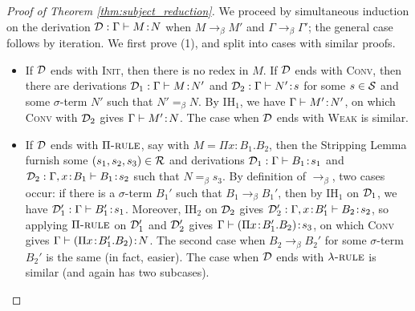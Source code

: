 \documentclass[reqno, twoside]{article}
\begin{document}
    \begin{proof}[Proof of Theorem \ref{thm:subject_reduction}]
        We proceed by simultaneous induction on the derivation $\mathcal{D}:\Gamma\vdash M\!:\!N$ when $M\rightarrow_\beta M'$ and $\Gamma\rightarrow_\beta\Gamma'$; the general case follows by iteration. We first prove (1), and split into cases with similar proofs.
        \begin{itemize}\small\vspace{-0.05in}
            \item If $\mathcal{D}$ ends with \textsc{Init}, then there is no redex in $M$. If $\mathcal{D}$ ends with \textsc{Conv}, then there are derivations $\mathcal{D}_1:\Gamma\vdash M\!:\!N'$ and $\mathcal{D}_2:\Gamma\vdash N'\!:\! s$ for some $s\in\mathcal{S}$ and some $\sigma$-term $N'$ such that $N'=_\beta N$. By $\mathrm{IH}_1$, we have $\Gamma\vdash M'\!:\!N'$, on which \textsc{Conv} with $\mathcal{D}_2$ gives $\Gamma\vdash M'\!:\!N$. The case when $\mathcal{D}$ ends with \textsc{Weak} is similar.
                \vspace{-0.05in}
            \item If $\mathcal{D}$ ends with $\Pi{\normalfont\textsc{-rule}}$, say with $M=\Pi x\!:\!B_1.B_2$, then the Stripping Lemma furnish some $(s_1,s_2,s_3)\in\mathcal{R}$ and derivations $\mathcal{D}_1:\Gamma\vdash B_1\!:\!s_1$ and $\mathcal{D}_2:\Gamma,x\!:\!B_1\vdash B_1\!:\!s_2$ such that $N=_\beta s_3$. By definition of $\rightarrow_\beta$, two cases occur: if there is a $\sigma$-term $B_1'$ such that $B_1\rightarrow_\beta B_1'$, then by $\mathrm{IH}_1$ on $\mathcal{D}_1$, we have $\mathcal{D}'_1:\Gamma\vdash B_1'\!:\!s_1$. Moreover, $\mathrm{IH}_2$ on $\mathcal{D}_2$ gives $\mathcal{D}'_2:\Gamma,x\!:\!B_1'\vdash B_2\!:\!s_2$, so applying $\Pi{\normalfont\textsc{-rule}}$ on $\mathcal{D}'_1$ and $\mathcal{D}'_2$ gives $\Gamma\vdash(\Pi x\!:\!B_1'.B_2)\!:\!s_3$, on which \textsc{Conv} gives $\Gamma\vdash(\Pi x\!:\!B_1'.B_2)\!:\!N$. The second case when $B_2\rightarrow_\beta B_2'$ for some $\sigma$-term $B_2'$ is the same (in fact, easier). The case when $\mathcal{D}$ ends with $\lambda{\normalfont\textsc{-rule}}$ is similar (and again has two subcases).
                \vspace{-0.05in}

\end{itemize}
\end{proof}
\end{document}
